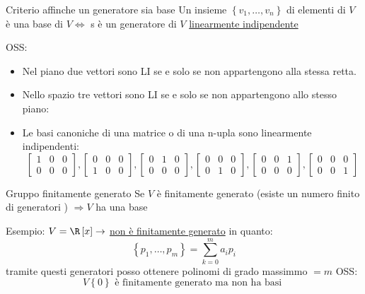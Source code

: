 \begin{teorema}{Criterio affinche un generatore sia base}
	Un insieme $\left\{ v_1,\ldots,v_n \right\} $ di elementi di $V$ è una base di $V \Leftrightarrow $ s è un generatore di $V$ \underline{linearmente indipendente}
\end{teorema}
OSS:
\begin{itemize}
	\item Nel piano due vettori sono LI se e solo se non appartengono alla stessa retta.
	\item Nello spazio tre vettori sono LI se e solo se non appartengono allo stesso piano:
	\item Le basi canoniche di una matrice o di una n-upla sono linearmente indipendenti:
	      \[
		      \left[\begin{array}{lll}1 & 0 & 0 \\ 0 & 0 & 0\end{array}\right],\left[\begin{array}{lll}0 & 0 & 0 \\ 1 & 0 & 0\end{array}\right],\left[\begin{array}{lll}0 & 1 & 0 \\ 0 & 0 & 0\end{array}\right],\left[\begin{array}{lll}0 & 0 & 0 \\ 0 & 1 & 0\end{array}\right],\left[\begin{array}{lll}0 & 0 & 1 \\ 0 & 0 & 0\end{array}\right],\left[\begin{array}{lll}0 & 0 & 0 \\ 0 & 0 & 1\end{array}\right]
	      \]

\end{itemize}
\begin{definizione}{Gruppo finitamente generato}
	Se $V$ è finitamente generato (esiste un numero finito di generatori ) $ \Rightarrow V$ ha una base
\end{definizione}
Esempio: $V = \R\left[ x \right] \rightarrow $ \underline{non è finitamente generato}
in quanto:
\[
	\left\{ p_1,\ldots,p_m \right\} = \sum_{k=0}^{m} a_ip_i
\]
tramite questi generatori posso ottenere polinomi di grado massimmo $= m$
\vskip3mm
OSS:
\[
	V\left\{ 0 \right\}  \text{ è finitamente generato ma non ha basi }
\]
